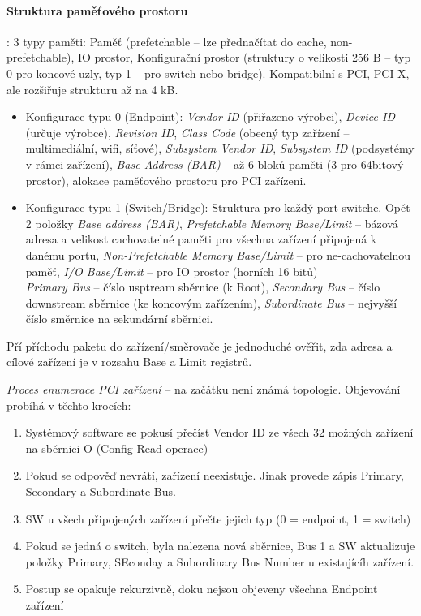 \documentclass[a4paper, 11pt]{report}
\begin{document}
\paragraph{Struktura paměťového prostoru}: 3 typy paměti: Paměť (prefetchable -- lze přednačítat do cache, non-prefetchable), IO prostor, Konfigurační prostor (struktury o velikosti 256 B -- typ 0 pro koncové uzly, typ 1 -- pro switch nebo bridge). Kompatibilní s PCI, PCI-X, ale rozšiřuje strukturu až na 4 kB.
\begin{itemize}
	\item Konfigurace typu 0 (Endpoint): \emph{Vendor ID} (přiřazeno výrobci), \emph{Device ID} (určuje výrobce), \emph{Revision ID}, \emph{Class Code} (obecný typ zařízení -- multimediální, wifi, síťové), \emph{Subsystem Vendor ID}, \emph{Subsystem ID} (podsystémy v rámci zařízení), \emph{Base Address (BAR)} -- až 6 bloků paměti (3 pro 64bitový prostor), alokace paměťového prostoru pro PCI zařízeni.
	\item Konfigurace typu 1 (Switch/Bridge): Struktura pro každý port switche. Opět 2 položky \emph{Base address (BAR)}, \emph{Prefetchable Memory Base/Limit} -- bázová adresa a velikost cachovatelné paměti pro všechna zařízení připojená k danému portu, \emph{Non-Prefetchable Memory Base/Limit} -- pro ne-cachovatelnou paměť, \emph{I/O Base/Limit} -- pro IO prostor (horních 16 bitů)\\
	\emph{Primary Bus} -- číslo usptream sběrnice (k Root), \emph{Secondary Bus} -- číslo downstream sběrnice (ke koncovým zařízením), \emph{Subordinate Bus} -- nejvyšší číslo směrnice na sekundární sběrnici.
\end{itemize}
Pří příchodu paketu do zařízení/směrovače je jednoduché ověřit, zda adresa a cílové zařízení je v rozsahu Base a Limit registrů.

\emph{Proces enumerace PCI zařízení} -- na začátku není známá topologie. Objevování probíhá v těchto krocích:
\begin{enumerate}
	\item Systémový software se pokusí přečíst Vendor ID ze všech 32 možných zařízení na sběrnici O (Config Read operace)
	\item Pokud se odpověď nevrátí, zařízení neexistuje. Jinak provede zápis Primary, Secondary a Subordinate Bus.
	\item SW u všech připojených zařízení přečte jejich typ (0 = endpoint, 1 = switch)
	\item Pokud se jedná o switch, byla nalezena nová sběrnice, Bus 1 a SW aktualizuje položky Primary, SEconday a Subordinary Bus Number u existujícíh zařízení.
	\item Postup se opakuje rekurzivně, doku nejsou objeveny všechna Endpoint zařízení
\end{enumerate}
\end{document}
